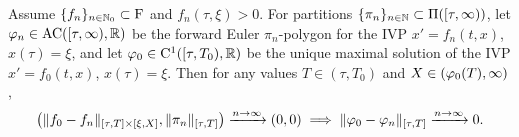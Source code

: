 \begin{theorem}\label{thm:euler_converge}
    Assume $\{f_n\}_{n\in\mathbb{N}_0}\subset\mathrm{F}$ and $f_n(\tau,\xi)>0$. For partitions $\{\pi_n\}_{n\in\mathbb{N}}\subset\Pi([\tau,\infty))$, let $\varphi_n\in\mathrm{AC}([\tau,\infty),\mathbb{R})$ be the forward Euler $\pi_n$-polygon for the IVP $x'=f_n(t,x)$, $x(\tau)=\xi$, and let $\varphi_0\in\mathrm{C}^1([\tau,T_0),\mathbb{R})$ be the unique maximal solution of the IVP $x'=f_0(t,x)$, $x(\tau)=\xi$. Then for any values $T\in(\tau,T_0)$ and $X\in(\varphi_0(T),\infty)$,
    \begin{equation}\label{eq:euler_converge}
        \left(\Vert f_0 - f_n \Vert_{[\tau,T]\times[\xi,X]}, \Vert\pi_n\Vert_{[\tau,T]}\right) \xrightarrow{n\to\infty}(0,0) \implies \Vert\varphi_0 - \varphi_n\Vert_{[\tau,T]}\xrightarrow{n\to\infty}0.
    \end{equation}
\end{theorem}
